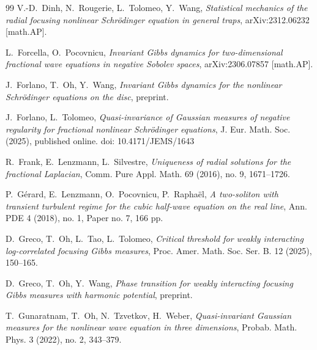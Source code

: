 \documentclass[letterpaper, 11pt,  reqno]{amsart}
\numberwithin{equation}{section}
\numberwithin{theorem}{section}
\begin{document}
\begin{thebibliography}{99}
V.-D.~Dinh, N.~Rougerie, L.~Tolomeo, Y.~Wang, 
{\it 
Statistical mechanics of the radial focusing nonlinear Schr\"odinger equation in general traps}, 
arXiv:2312.06232 [math.AP].

	
L.~Forcella, O.~Pocovnicu,
{\it Invariant Gibbs dynamics for two-dimensional fractional wave equations in negative Sobolev spaces},
arXiv:2306.07857 [math.AP].


J.~Forlano, T.~Oh, Y.~Wang,
{\it  Invariant Gibbs dynamics for the nonlinear Schr\"odinger equations on the disc}, 
preprint. 

J.~Forlano, L.~Tolomeo, 
{\it Quasi-invariance of Gaussian measures of negative regularity for fractional nonlinear Schr\"odinger equations},  J. Eur. Math. Soc. (2025), published online.
doi: 10.4171/JEMS/1643

	
R.~Frank, E.~Lenzmann, L.~Silvestre,
{\it Uniqueness of radial solutions for the fractional Laplacian}, 
Comm. Pure Appl. Math. 69 (2016), no. 9, 1671--1726.
	
	




P.~G\'erard, E.~Lenzmann, O.~Pocovnicu, P.~Rapha\"el, 
{\it A two-soliton with transient turbulent regime for the cubic half-wave equation on the real line}, 
Ann. PDE 4 (2018), no. 1, Paper no. 7, 166 pp.



D.~Greco, T.~Oh, L.~Tao, L.~Tolomeo,
{\it 
Critical threshold for weakly interacting log-correlated focusing Gibbs measures}, 
Proc. Amer. Math. Soc. Ser. B.
 12 (2025), 150--165. 


D.~Greco, T.~Oh, Y.~Wang, 
{\it Phase transition for weakly interacting focusing Gibbs measures with  harmonic potential},
preprint.
	

T.~Gunaratnam, T.~Oh, N.~Tzvetkov, H.~Weber,
{\it  Quasi-invariant Gaussian measures for the nonlinear wave equation in three dimensions}, Probab. Math. Phys. 3 (2022), no. 2, 343--379. 




\end{thebibliography}
\end{document}
